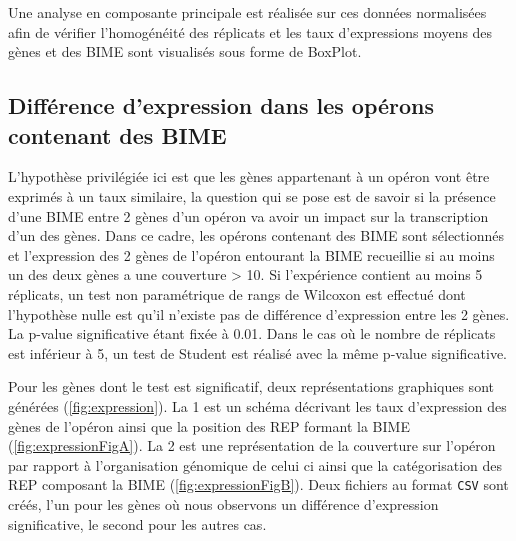 \documentclass[12pt,a4paper]{report}
\begin{document}
\begin{onehalfspace}
Une analyse en composante principale est réalisée sur ces données normalisées afin de vérifier l'homogénéité des réplicats et les taux d'expressions moyens des gènes et des BIME sont visualisés sous forme de BoxPlot.

\subsection*{Différence d'expression dans les opérons contenant des BIME}
\label{subsec:expression}
L'hypothèse privilégiée ici est que les gènes appartenant à un opéron vont être exprimés à un taux similaire, la question qui se pose est de savoir si la présence d'une BIME entre 2 gènes d'un opéron va avoir un impact sur la transcription d'un des gènes. Dans ce cadre, les opérons contenant des BIME sont sélectionnés et l'expression des 2 gènes de l'opéron entourant la BIME recueillie si au moins un des deux gènes a une couverture > 10. Si l'expérience contient au moins 5 réplicats, un test non paramétrique de rangs de Wilcoxon est effectué dont l'hypothèse nulle est qu'il n'existe pas de différence d'expression entre les 2 gènes. La p-value significative étant fixée à 0.01. Dans le cas où le nombre de réplicats est inférieur à 5, un test de Student est réalisé avec la même p-value significative.

Pour les gènes dont le test est significatif, deux représentations graphiques sont générées (\autoref{fig:expression}). La 1 est un schéma décrivant les taux d'expression des gènes de l'opéron ainsi que la position des REP formant la BIME (\autoref{fig:expressionFigA}). La 2 est une représentation de la couverture sur l'opéron par rapport à l'organisation génomique de celui ci ainsi que la catégorisation des REP composant la BIME (\autoref{fig:expressionFigB}). Deux fichiers au format \texttt{CSV} sont créés, l'un pour les gènes où nous observons un différence d'expression significative, le second pour les autres cas.


\end{onehalfspace}
\end{document}
